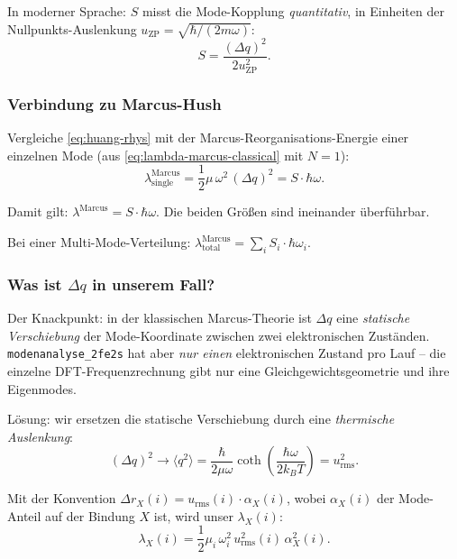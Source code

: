 \documentclass[11pt,a4paper,twoside]{article}
\theoremstyle{remark}
\begin{document}
In moderner Sprache: $S$ misst die Mode-Kopplung \emph{quantitativ},
in Einheiten der Nullpunkts-Auslenkung
$u_\text{ZP} = \sqrt{\hbar/(2m\omega)}$:
\begin{equation}
  S = \frac{(\Delta q)^2}{2 u_\text{ZP}^2}.
  \label{eq:huang-rhys-units}
\end{equation}

\subsubsection*{Verbindung zu Marcus-Hush}

Vergleiche \eqref{eq:huang-rhys} mit der Marcus-Reorganisations-Energie
einer einzelnen Mode (aus \eqref{eq:lambda-marcus-classical} mit
$N=1$):
\begin{equation}
  \lambda^\text{Marcus}_\text{single} = \frac{1}{2}\mu\,\omega^2\,(\Delta q)^2
  = S \cdot \hbar\omega.
  \label{eq:lambda-vs-S}
\end{equation}

Damit gilt: \textbf{$\lambda^\text{Marcus} = S \cdot \hbar\omega$}.
Die beiden Gr\"o{\ss}en sind ineinander \"uberf\"uhrbar.

Bei einer Multi-Mode-Verteilung:
$\lambda^\text{Marcus}_\text{total} = \sum_i S_i \cdot \hbar\omega_i$.

\subsubsection*{Was ist $\Delta q$ in unserem Fall?}

Der Knackpunkt: in der klassischen Marcus-Theorie ist $\Delta q$ eine
\emph{statische Verschiebung} der Mode-Koordinate zwischen zwei
elektronischen Zust\"anden. \texttt{modenanalyse\_2fe2s} hat aber
\emph{nur einen} elektronischen Zustand pro Lauf -- die einzelne
DFT-Frequenzrechnung gibt nur eine Gleichgewichtsgeometrie und ihre
Eigenmodes.

L\"osung: wir ersetzen die statische Verschiebung durch eine
\emph{thermische Auslenkung}:
\begin{equation}
  (\Delta q)^2 \to \langle q^2 \rangle = \frac{\hbar}{2\mu\omega}
  \coth\!\left(\frac{\hbar\omega}{2k_BT}\right)
  = u_\text{rms}^2.
  \label{eq:thermal-replacement}
\end{equation}

Mit der Konvention $\Delta r_X(i) = u_\text{rms}(i) \cdot \alpha_X(i)$,
wobei $\alpha_X(i)$ der Mode-Anteil auf der Bindung $X$ ist, wird
unser $\lambda_X(i)$:
\begin{equation}
  \lambda_X(i) = \frac{1}{2}\mu_i\,\omega_i^2\,
                  u_\text{rms}^2(i)\,\alpha_X^2(i).
\end{equation}
\end{document}
